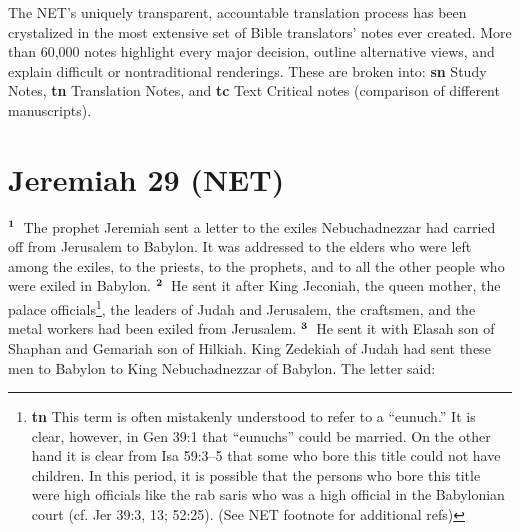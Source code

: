 \documentclass[12pt,a4paper,final]{article}
\renewcommand{\textsuperscript}[1]{\ensuremath{^{\textbf{\scriptsize #1}}}}
\begin{document}
The NET’s uniquely transparent, accountable translation process has been crystalized in the most extensive set of Bible translators’ notes ever created. More than 60,000 notes highlight every major decision, outline alternative views, and explain difficult or nontraditional renderings. These are broken into: \textbf{sn} Study Notes, \textbf{tn} Translation Notes, and \textbf{tc} Text Critical notes (comparison of different manuscripts).

\section*{Jeremiah 29 (NET)}

\textsuperscript{1} The prophet Jeremiah sent a letter to the exiles Nebuchadnezzar had carried off from Jerusalem to Babylon. It was addressed to the elders who were left among the exiles, to the priests, to the prophets, and to all the other people who were exiled in Babylon. \textsuperscript{2} He sent it after King Jeconiah, the queen mother, the palace officials\footnote{\textbf{tn} This term is often mistakenly understood to refer to a “eunuch.” It is clear, however, in Gen 39:1 that “eunuchs” could be married. On the other hand it is clear from Isa 59:3–5 that some who bore this title could not have children. In this period, it is possible that the persons who bore this title were high officials like the rab saris who was a high official in the Babylonian court (cf. Jer 39:3, 13; 52:25). (See NET footnote for additional refs)}, the leaders of Judah and Jerusalem, the craftsmen, and the metal workers had been exiled from Jerusalem. \textsuperscript{3} He sent it with Elasah son of Shaphan and Gemariah son of Hilkiah. King Zedekiah of Judah had sent these men to Babylon to King Nebuchadnezzar of Babylon. The letter said: 
\end{document}
